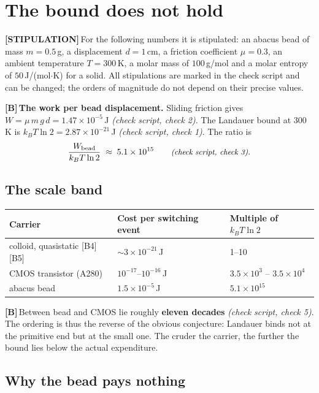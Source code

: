 \documentclass[11pt,a4paper]{article}
\newcommand{\LS}{\textcolor{laySet}{\textbf{\footnotesize\textsf{[STIPULATION]}}}\,}
\newcommand{\LB}{\textcolor{layB}{\textbf{\footnotesize\textsf{[B]}}}\,}
\newcommand{\pruef}[1]{{\small\itshape(check script, #1)}}
\begin{document}
\section{The bound does not hold}

\LS For the following numbers it is stipulated: an abacus bead of mass
$m = 0.5$\,g, a displacement $d = 1$\,cm, a friction coefficient $\mu = 0.3$, an
ambient temperature $T = 300$\,K, a molar mass of $100$\,g/mol and a molar entropy
of $50$\,J/(mol$\cdot$K) for a solid. All stipulations are marked in the check
script and can be changed; the orders of magnitude do not depend on their precise
values.

\LB \textbf{The work per bead displacement.} Sliding friction gives
$W = \mu\,m\,g\,d = 1.47\times10^{-5}$\,J \pruef{check 2}. The Landauer bound at
300\,K is $k_B T \ln 2 = 2.87\times10^{-21}$\,J \pruef{check 1}. The ratio is
\begin{equation}
  \frac{W_{\text{bead}}}{k_B T \ln 2} \;\approx\; 5.1\times10^{15}
  \qquad \text{\pruef{check 3}} .
\end{equation}

\subsection{The scale band}

\begin{center}
\small
\begin{tabular}{@{}lll@{}}
\toprule
\textbf{Carrier} & \textbf{Cost per switching event} & \textbf{Multiple of $k_BT\ln 2$} \\
\midrule
colloid, quasistatic [B4][B5] & ${\sim}3\times10^{-21}$\,J & 1--10 \\
CMOS transistor (A280) & $10^{-17}$--$10^{-16}$\,J & $3.5\times10^{3}$ -- $3.5\times10^{4}$ \\
abacus bead & $1.5\times10^{-5}$\,J & $5.1\times10^{15}$ \\
\bottomrule
\end{tabular}
\end{center}

\LB Between bead and CMOS lie roughly \textbf{eleven decades} \pruef{check 5}. The
ordering is thus the reverse of the obvious conjecture: Landauer binds not at the
primitive end but at the small one. The cruder the carrier, the further the bound
lies below the actual expenditure.

\subsection{Why the bead pays nothing}
\end{document}
